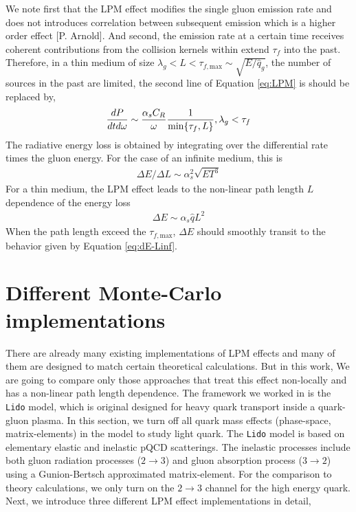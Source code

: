 \documentclass[aps, prc, reprint, amsmath, groupedaddress, nofootinbib]{revtex4-1}
\begin{document}
We note first that the LPM effect modifies the single gluon emission rate and does not introduces correlation between subsequent emission which is a higher order effect [P. Arnold].
And second, the emission rate at a certain time receives coherent contributions from the collision kernels within extend $\tau_f$ into the past.
Therefore, in a thin medium of size $\lambda_g < L< \tau_{f,\textrm{max}} \sim \sqrt{E/\hat{q}_g}$, the number of sources in the past are limited, the second line of Equation \ref{eq:LPM} is should be replaced by,
\begin{eqnarray}
\frac{dP}{dt d\omega} \sim 
 \frac{\alpha_s C_R}{\omega} \frac{1}{\min\{\tau_f,L\}}, \hfill \lambda_g < \tau_f
\end{eqnarray}
The radiative energy loss is obtained by integrating over the differential rate times the gluon energy. 
For the case of an infinite medium, this is
\begin{eqnarray}\label{eq:dE-Linf}
\Delta E/\Delta L \sim \alpha_s^2 \sqrt{ET^3}
\end{eqnarray}
For a thin medium, the LPM effect leads to the non-linear path length $L$ dependence of the energy loss
\begin{eqnarray}\label{eq:dE-Lfinite}
\Delta E \sim \alpha_s \hat{q} L^2
\end{eqnarray}
When the path length exceed the $\tau_{f,\textrm{max}}$, $\Delta E$ should smoothly transit to the behavior given by Equation \ref{eq:dE-Linf}.

\section{Different Monte-Carlo implementations}\label{section:MC}
There are already many existing implementations of LPM effects and many of them are designed to match certain theoretical calculations. 
But in this work, We are going to compare only those approaches that treat this effect non-locally and has a non-linear path length dependence.
The framework we worked in is the {\tt Lido} model, which is original designed for heavy quark transport inside a quark-gluon plasma. 
In this section, we turn off all quark mass effects (phase-space, matrix-elements) in the model to study light quark.
The {\tt Lido} model is based on elementary elastic and inelastic pQCD scatterings. 
The inelastic processes include both gluon radiation processes ($2\rightarrow 3$) and gluon absorption process ($3\rightarrow 2$) using a Gunion-Bertsch approximated matrix-element.
For the comparison to theory calculations, we only turn on the $2\rightarrow 3$ channel for the high energy quark.
Next, we introduce three different LPM effect implementations in detail,
\end{document}
